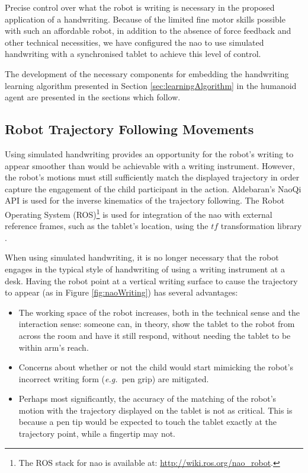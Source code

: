\documentclass{sig-alternate}
\newcommand{\eg}{{\textit{e.g.~}}}
\begin{document}
Precise control over what the robot is writing is necessary in the proposed
application of a handwriting. Because of the limited fine motor skills possible
with such an affordable robot, in addition to the absence of force feedback and
other technical necessities, we have configured the {\sc nao} to use simulated
handwriting with a synchronised tablet to achieve this level of control. 

The development of the necessary components for embedding the handwriting
learning algorithm presented in Section \ref{sec:learningAlgorithm} in the
humanoid agent are presented in the sections which follow.

\subsection{Robot Trajectory Following Movements}

Using simulated handwriting provides an opportunity for the robot's writing to
appear smoother than would be achievable with a writing instrument. However, the
robot's motions must still sufficiently match the displayed trajectory in order
capture the engagement of the child participant in the action. Aldebaran's NaoQi
API is used for the inverse kinematics of the trajectory following. The Robot
Operating System (ROS)\footnote{The ROS stack for {\sc nao} is available at:
\url{http://wiki.ros.org/nao_robot}.} is used for integration of the {\sc nao}
with external reference frames, such as the tablet's location, using the $tf$
transformation library \cite{Foote2013}.

When using simulated handwriting, it is no longer necessary that the robot
engages in the typical style of handwriting of using a writing instrument at a
desk.  Having the robot point at a vertical writing surface to cause the
trajectory to appear (as in Figure \ref{fig:naoWriting}) has several advantages:

\begin{itemize}

    \item The working space of the robot increases, both in the technical sense
        and the interaction sense: someone can, in theory, show the tablet to
        the robot from across the room and have it still respond, without
        needing the tablet to be within arm's reach.

    \item Concerns about whether or not the child would start mimicking the
        robot's incorrect writing form (\eg pen grip) are mitigated. 

    \item Perhaps most significantly, the accuracy of the matching of the
        robot's motion with the trajectory displayed on the tablet is not as
        critical. This is because a pen tip would be expected to touch the
        tablet exactly at the trajectory point, while a fingertip may not.

\end{itemize}
\end{document}
